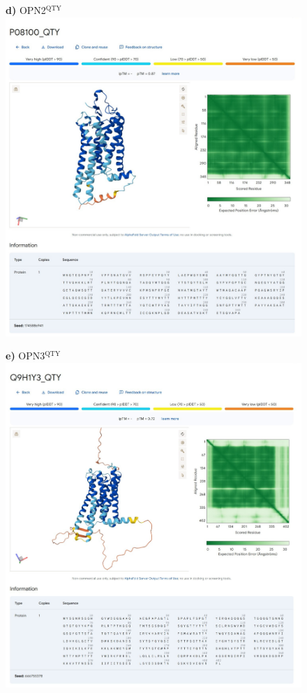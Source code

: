\documentclass[fleqn,12pt]{supp}
\begin{document}
\newpage
\begin{figure}[H]
    \textbf{d)} OPN2$^{\textrm{QTY}}$ \\
    \includegraphics[width=\linewidth]{SuppFigures/af3 opn2 qty.jpg}
\end{figure}

\newpage
\begin{figure}[H]
    \textbf{e)} OPN3$^{\textrm{QTY}}$ \\
    \includegraphics[width=\linewidth]{SuppFigures/af3 opn3 qty.jpg}
\end{figure}
\end{document}
